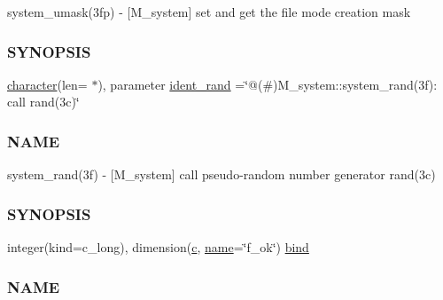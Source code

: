 \begin{DoxyCompactItemize}
\begin{DoxyCompactList}
system\+\_\+umask(3fp) -\/ \mbox{[}M\+\_\+system\mbox{]} set and get the file mode creation mask \subsubsection*{S\+Y\+N\+O\+P\+S\+IS}\end{DoxyCompactList}\item 
\hyperlink{option__stopwatch_83_8txt_abd4b21fbbd175834027b5224bfe97e66}{character}(len= $\ast$), parameter \hyperlink{namespacem__system_a7abe4c85d9ea573a1492865e21cee2be}{ident\+\_\+rand} =\char`\"{}@(\#)M\+\_\+system\+::system\+\_\+rand(3f)\+: call rand(3c)\char`\"{}
\begin{DoxyCompactList}\small\item\em \subsubsection*{N\+A\+ME}

system\+\_\+rand(3f) -\/ \mbox{[}M\+\_\+system\mbox{]} call pseudo-\/random number generator rand(3c) \subsubsection*{S\+Y\+N\+O\+P\+S\+IS}\end{DoxyCompactList}\item 
integer(kind=c\+\_\+long), dimension(\hyperlink{c_8f90_aeb1f4e639be0213b4cbd07f2583a5b1f}{c}, \hyperlink{M__stopwatch_83_8txt_a3f508a893ae4c3b397b4383e33b9bcae}{name}=\char`\"{}f\+\_\+ok\char`\"{}) \hyperlink{namespacem__system_afe662f3eb5605285a495404491087190}{bind}
\begin{DoxyCompactList}\small\item\em \subsubsection*{N\+A\+ME}


\end{DoxyCompactList}
\end{DoxyCompactItemize}
